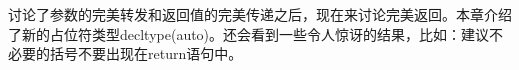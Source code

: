 讨论了参数的完美转发和返回值的完美传递之后，现在来讨论完美返回。本章介绍了新的占位符类型decltype(auto)。还会看到一些令人惊讶的结果，比如：建议不必要的括号不要出现在return语句中。\par